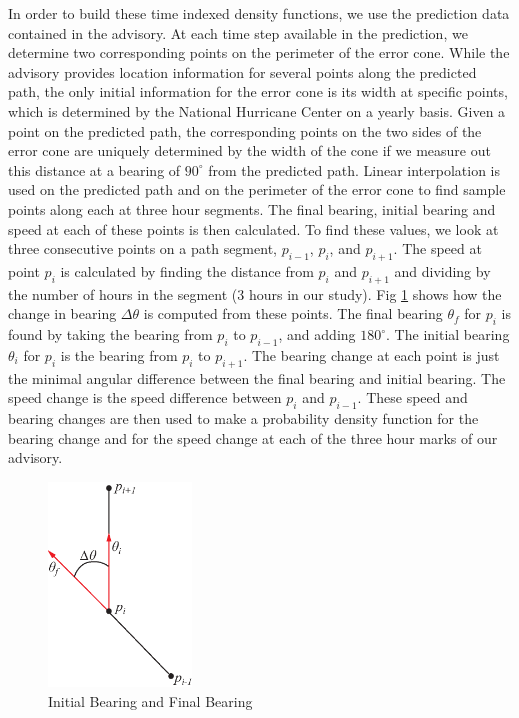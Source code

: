 \documentclass[journal]{vgtc}                %
\begin{document}
In order to build these time indexed density functions, we use the prediction data contained in the advisory.
At each time step available in the prediction, we determine two corresponding points on the perimeter of the
error cone.
While the advisory provides location information for several points along the predicted path, the only 
initial information for the error cone is its width at specific points, which is determined by the 
National Hurricane Center on a yearly basis.  
Given a point on the predicted path, the corresponding points on the two sides of the error cone are uniquely
determined by the width of the cone if we measure out this distance at a bearing of $90^\circ$ from the
predicted path.
Linear interpolation is used on the predicted path and on the perimeter of the error cone to find sample 
points along each at three hour segments. The final bearing, initial bearing and speed at each of these points 
is then calculated.
To find these values, we look at three consecutive points on a path segment, $p_{i-1}$, $p_{i}$, and $p_{i+1}$.  
The speed at point $p_{i}$ is calculated by finding the distance from $p_{i}$ and $p_{i+1}$ and dividing by the 
number of hours in the segment (3 hours in our study).   Fig \ref{fig:bearing} shows how the change in bearing $\Delta\theta$ is computed from these points.  The final bearing $\theta_f$ for $p_{i}$ is found by taking the bearing 
from $p_{i}$ to $p_{i-1}$, and adding $180^\circ$.  The initial bearing $\theta_i$ for $p_{i}$ is the bearing 
from $p_{i}$ to $p_{i+1}$.  The bearing change at each point is just the minimal angular difference between the final bearing and initial bearing.  The speed change is the speed difference between $p_{i}$ and $p_{i-1}$.
These speed and bearing changes are then used to make a probability density function for the bearing change and for the speed change at each of the three hour marks of our advisory.  
\begin{figure}[htb]
 \centering
 \includegraphics[width=1.5in]{figures/bearing.eps}
 \caption{Initial Bearing and Final Bearing}
 \label{fig:bearing}
\end{figure}
\end{document}
